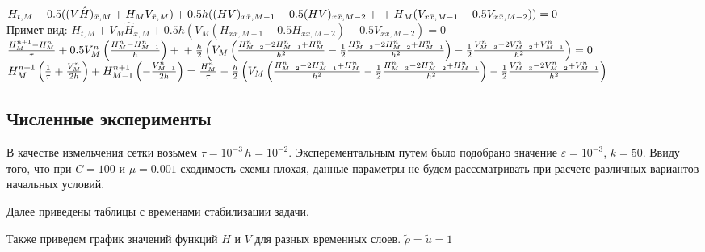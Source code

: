 $
H_{t,M} + 0.5((V\hat{H})_{\bar{x},M} + H_MV_{\bar{x},M}) + 0.5h((HV)_{x\bar{x},M-1} - 0.5(HV)_{x\bar{x},M-2} + \\
+ H_M(V_{x\bar{x},M-1} - 0.5 V_{x\bar{x},M-2})) = 0
$\\

Примет вид: 
$
H_{t,M} + V_M\hat{H}_{\bar{x}, M} + 0.5h(V_M(H_{x\bar{x},M-1} - 0.5H_{x\bar{x},M-2}) - 0.5 V_{x\bar{x},M-2}) = 0
$\\

$
\frac{H_M^{n+1} - H_M^n}{\tau} + 0.5V_M^n\left(\frac{H_{M}^n-H_{M-1}^n}{h}\right) + \\
+ \frac{h}{2}\left(V_M\left(\frac{H_{M-2}^n-2H_{M-1}^n + H_{M}^n}{h^2} -\frac{1}{2}\frac{H_{M-3}^n-2H_{M-2}^n + H_{M-1}^n}{h^2}\right) -\frac{1}{2}\frac{V_{M-3}^n - 2V_{M-2}^n + V_{M-1}^n}{h^2}\right) = 0
$\\

$
H_M^{n+1}\left(\frac{1}{\tau} + \frac{V_M^n}{2h}\right) + H_{M-1}^{n+1}\left(-\frac{V_{M-1}^n}{2h}\right) = \frac{H_M^n}{\tau} - \\ \frac{h}{2}\left(V_M\left(\frac{H_{M-2}^n-2H_{M-1}^n + H_{M}^n}{h^2} -\frac{1}{2}\frac{H_{M-3}^n-2H_{M-2}^n + H_{M-1}^n}{h^2}\right) -\frac{1}{2}\frac{V_{M-3}^n - 2V_{M-2}^n + V_{M-1}^n}{h^2}\right)
$\\

\newpage
\subsection{Численные эксперименты}
В качестве измельчения сетки возьмем $\tau = 10^{-3} \, h = 10^{-2}$. Эксперементальным путем было подобрано значение $\varepsilon = 10^{-3}$, $k = 50$. Ввиду того, что при $C = 100$ и $\mu = 0.001$ сходимость схемы плохая, данные параметры не будем расссматривать при расчете различных вариантов начальных условий.


Далее приведены таблицы с временами стабилизации задачи.




\newpage




\newpage
Также приведем график значений функций $H$ и $V$ для разных временных слоев. $\tilde{\rho} = \tilde{u} = 1$

